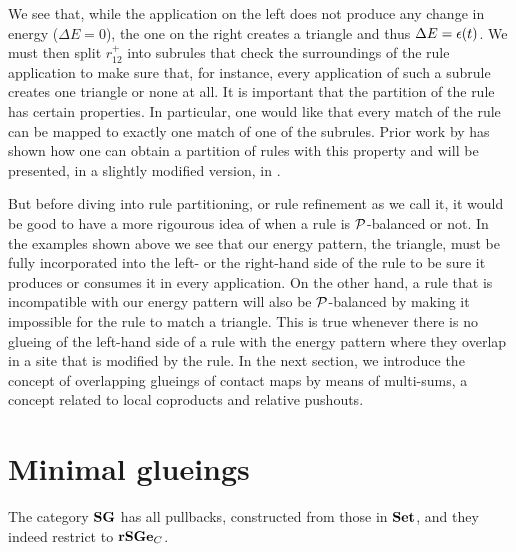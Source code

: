 We see that, while the application on the left
does not produce any change in energy ($\Delta E = 0$),
the one on the right creates a triangle
and thus $\Delta E = \epsilon(t)$. %
We must then split $r^+_{12}$ into subrules that check
the surroundings of the rule application
to make sure that, for instance,
every application of such a subrule
creates one triangle or none at all.
It is important that the partition of the rule
has certain properties.
In particular, one would like that every match of the rule
can be mapped to exactly one match of one of the subrules.
Prior work by \citet{refinement} has shown how
one can obtain a partition of rules with this property
and will be presented, in a slightly modified version,
in . %

But before diving into rule partitioning,
or rule refinement as we call it,
it would be good to have a more rigourous idea of
when a rule is $\mathcal{P}$-balanced or not.
In the examples shown above we see that
our energy pattern, the triangle,
must be fully incorporated into
the left- or the right-hand side of the rule
to be sure it produces or consumes it in every application.
On the other hand, a rule that is incompatible
with our energy pattern will also be $\mathcal{P}$-balanced
by making it impossible for the rule to match a triangle.
This is true whenever there is no glueing %
of the left-hand side of a rule with the energy pattern
where they overlap in a site that is modified by the rule.
In the next section,
we introduce the concept of overlapping glueings
of contact maps by means of multi-sums,
a concept related to local coproducts and relative pushouts.


\section{Minimal glueings}
\label{sec:mg}

The category $\mathbf{SG}$ has all pullbacks,
constructed from those in $\mathbf{Set}$,
and they indeed restrict to $\mathbf{rSGe}_C$.

